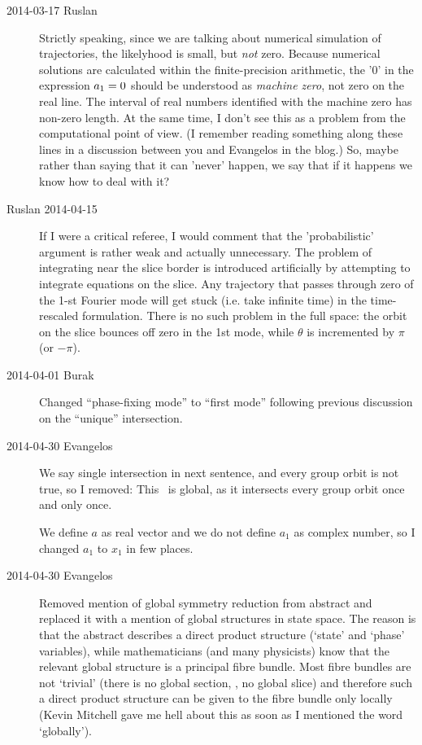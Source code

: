 \begin{description}
\item[2014-03-17 Ruslan]
Strictly speaking, since we are talking about numerical
    simulation of trajectories, the likelyhood is small, but {\em not} zero.
    Because numerical solutions are calculated within the finite-precision
    arithmetic, the '0' in the expression $a_1 =0$ should be understood as
    {\em machine zero}, not zero on the real line.  The interval of real
    numbers identified with the machine zero has non-zero length.  At the
    same time, I don't see this as a problem from the computational point of
    view. (I remember reading something along these lines in a discussion
    between you and Evangelos in the blog.) So, maybe rather than saying that
    it can 'never' happen, we say that if it happens we know how to deal with
    it?

\item[Ruslan 2014-04-15] If I were a critical referee, I would comment that the
    'probabilistic' argument is rather weak and actually unnecessary.
    The problem of integrating near the slice border is introduced
    artificially by attempting to integrate equations on the slice.  Any
    trajectory that passes through zero of the 1-st Fourier mode will get
    stuck (i.e. take infinite time) in the time-rescaled formulation.
    There is no such problem in the full space: the orbit on the slice
    bounces off zero in the 1st mode, while $\theta$ is incremented by
    $\pi$ (or $-\pi$).

\item[2014-04-01 Burak]
Changed ``phase-fixing mode'' to ``first mode'' following
previous discussion on the ``unique'' intersection.


\item[2014-04-30 Evangelos] We say single intersection in next sentence, and every
group orbit is not true, so I removed: This \slice\ is global, as it
intersects every group orbit once and only once.

We define $a$ as real vector and we do not define $a_1$
as complex number, so I changed $a_1$ to $x_1$ in few places.


\item[2014-04-30 Evangelos] Removed mention of global symmetry reduction
from abstract and replaced it with a mention of global structures in state
space. The reason is that the abstract describes a direct product structure
(`state' and `phase' variables), while mathematicians (and many physicists)
know that the relevant global structure is a principal fibre bundle.
Most fibre bundles are not `trivial' (there is no global section, \ie, no global slice)
and therefore such a direct product structure can be given to the fibre bundle
only locally (Kevin Mitchell gave me hell about this as soon as I mentioned the
word `globally').


\end{description}
